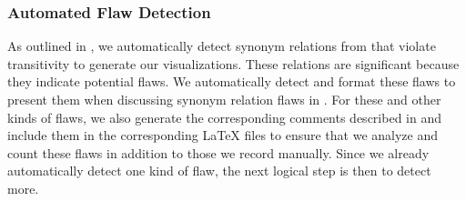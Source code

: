 
\subsubsection{Automated Flaw Detection}\label{auto-flaw-detect}

As outlined in , we automatically detect synonym relations
from \ourApproachGlossary{} that violate transitivity to generate our
visualizations. These relations are significant because they indicate potential
flaws. We automatically detect and format these flaws to present them when
discussing synonym relation flaws in . %
For these and other kinds of flaws, we also generate the corresponding comments
described in  and include them in the
corresponding \LaTeX{} files to ensure that we analyze and count these flaws in
addition to those we record manually. Since we already automatically detect
one kind of flaw, the next logical step is then to detect more.

